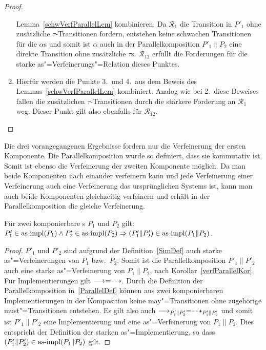 \begin{proof}
\begin{enumerate}
      Lemma~\ref{schwVerfParallelLem} kombinieren. Da $\mathcal{R}_1$ die
      Transition in $P'_1$ ohne zusätzliche $\tau$-Transitionen fordern,
      entstehen keine schwachen Transitionen für die $\alpha$s und somit ist
      $\alpha$ auch in der Parallelkomposition $P'_1\|P_2$ eine direkte
      Transition ohne zusätzliche $\tau$s. $\mathcal{R}_{12}$ erfüllt die
      Forderungen für die starke as"=Verfeinerungs"=Relation dieses Punktes.
    \item Hierfür werden die Punkte 3.\ und 4.\ aus dem Beweis des
      Lemmas~\ref{schwVerfParallelLem} kombiniert. Analog wie bei 2.\ diese
      Beweises fallen die zusätzlichen $\tau$-Transitionen durch die stärkere
      Forderung an $\mathcal{R}_1$ weg. Dieser Punkt gilt also ebenfalls für
      $\mathcal{R}_{12}$.
  \end{enumerate}
\end{proof}

Die drei vorangegangenen Ergebnisse fordern nur die Verfeinerung der ersten
Komponente. Die Parallelkomposition wurde so definiert, dass sie kommutativ
ist. Somit ist ebenso die Verfeinerung der zweiten Komponente möglich. Da man
beide Komponenten nach einander verfeinern kann und jede Verfeinerung einer
Verfeinerung auch eine Verfeinerung das ursprünglichen Systems ist, kann man
auch beide Komponenten gleichzeitig verfeinern und erhält in der
Parallelkomposition die gleiche Verfeinerung.

\begin{Kor}
  \label{ImpParallelKor}
  Für zwei komponierbare \MEIO{}s $P_1$ und $P_2$ gilt:
  $P'_1\in\mathrm{as}\text{-}\mathrm{impl} (P_1) \land P'_2 \in\mathrm{as}\text{-}\mathrm{impl} (P_2) \Rightarrow (P'_1\|P'_2)
  \in\mathrm{as}\text{-}\mathrm{impl} (P_1\|P_2)$.
\end{Kor}
\begin{proof}
  $P'_1$ und $P'_2$ sind aufgrund der Definition~\ref{SimDef} auch starke
  as"=Verfeinerungen von $P_1$ bzw.\ $P_2$. Somit ist die Parallelkomposition
  $P'_1\|P'_2$ auch eine starke as"=Verfeinerung von $P_1\|P_2$, nach
  Korollar~\ref{verfParallelKor}. Für Implementierungen gilt $\must =\may$.
  Durch die Definition der Parallelkomposition in~\ref{ParallelDef} können
  aus zwei komponierbaren Implementierungen in der Komposition keine
  may"=Transitionen ohne zugehörige must"=Transitionen entstehen. Es gilt also
  auch $\must _{P'_1\|P'_2} =\may _{P'_1\|P'_2}$ und somit ist $P'_1\|P'_2$
  eine Implementierung und eine as"=Verfeinerung von $P_1\|P_2$. Dies
  entspricht der Definition der starken as"=Implementierung, so dass
  $(P'_1\|P'_2)\in\mathrm{as}\text{-}\mathrm{impl} (P_1\|P_2)$ gilt.
\end{proof}

